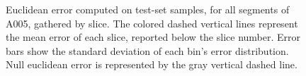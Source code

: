 \begin{figure}
\centering
{}
\caption{Euclidean error computed on test-set samples, for all segments of A005, gathered by slice. The colored dashed vertical lines represent the mean error of each slice, reported below the slice number. Error bars show the standard deviation of each bin's error distribution. Null euclidean error is represented by the gray vertical dashed line.}
\label{fig:3d_err_per_slice_seg}       %
\end{figure}

